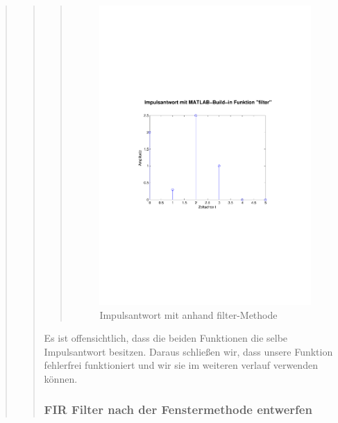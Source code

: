 \begin{quote}
\begin{quote}
\begin{quote}
			\begin{figure}[H]
		            \centering
		                \includegraphics[scale=0.5, trim = 1cm 6cm 1.5cm 8cm,
		                clip]{./Bilder/Impulsantwort_aufgabe11}
		                    \caption{Impulsantwort mit anhand filter-Methode}
		                    \label{fig:./Bilder/Impulsantwort_aufgabe11}
		            \end{figure}
		       
		  \end{quote}   
		  
		  Es ist offensichtlich, dass die beiden Funktionen die selbe Impulsantwort besitzen. Daraus schließen wir, dass
		  unsere Funktion fehlerfrei funktioniert und wir sie im weiteren verlauf verwenden können.
		  
		  \subsubsection{FIR Filter nach der Fenstermethode entwerfen}
		  \begin{quote}
		            

\end{quote}
\end{quote}
\end{quote}
